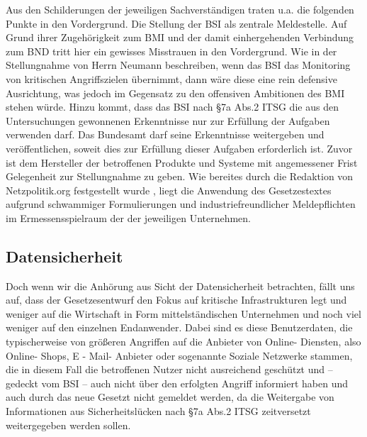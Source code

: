 \documentclass[a4paper,letterpaper,twocolumn,10pt,ngerman]{article}
\begin{document}
Aus den Schilderungen der jeweiligen Sachverständigen traten u.a. die folgenden Punkte in den Vordergrund. Die Stellung der BSI als zentrale Meldestelle. Auf Grund ihrer Zugehörigkeit zum BMI und der damit einhergehenden Verbindung zum BND tritt hier ein gewisses Misstrauen in den Vordergrund. Wie in der Stellungnahme von Herrn Neumann \cite[vlg.][S. 4]{NeuCCC15}  beschreiben, wenn das BSI das Monitoring von kritischen Angriffszielen übernimmt, dann wäre diese eine rein defensive Ausrichtung, was jedoch im Gegensatz zu den offensiven Ambitionen des BMI stehen würde. Hinzu kommt, dass das BSI nach §7a Abs.2 ITSG die aus den Untersuchungen gewonnenen Erkenntnisse nur zur Erfüllung der Aufgaben verwenden darf. Das Bundesamt darf seine Erkenntnisse weitergeben und veröffentlichen, soweit dies zur Erfüllung dieser Aufgaben erforderlich ist. Zuvor ist dem Hersteller der betroffenen Produkte und Systeme mit angemessener Frist Gelegenheit zur Stellungnahme zu geben. Wie bereites durch die Redaktion von Netzpolitik.org festgestellt wurde \cite{Bis15}, liegt die Anwendung des Gesetzestextes aufgrund schwammiger Formulierungen und industriefreundlicher Meldepflichten im Ermessensspielraum der der jeweiligen Unternehmen. 

\subsection{Datensicherheit}
\label{sub:Datensicherheit}
Doch wenn wir die Anhörung aus Sicht der Datensicherheit betrachten, fällt uns auf, dass der Gesetzesentwurf den Fokus auf kritische Infrastrukturen legt und weniger auf die Wirtschaft in Form mittelständischen Unternehmen und noch viel weniger auf den einzelnen Endanwender. Dabei sind es diese Benutzerdaten, die typischerweise von größeren Angriffen auf die Anbieter
von Online- Diensten, also Online- Shops, E - Mail- Anbieter oder sogenannte Soziale Netzwerke stammen, die in diesem Fall die betroffenen Nutzer nicht ausreichend geschützt und – gedeckt vom BSI – auch nicht über den erfolgten Angriff
informiert haben und auch durch das neue Gesetzt nicht gemeldet werden, da die Weitergabe von Informationen  aus Sicherheitslücken nach §7a Abs.2 ITSG zeitversetzt weitergegeben werden sollen.
\end{document}
